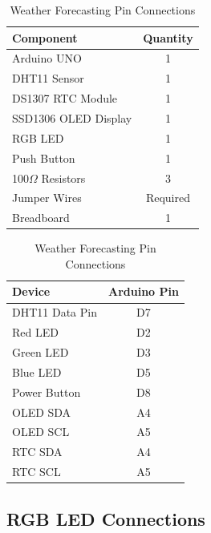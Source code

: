 \begin{table}[H]
\centering

\begin{minipage}[t]{0.52\textwidth}
\centering
\caption{Weather Forecasting System Components}
\label{tab:weather_components}

\begin{tabular}{|p{4.2cm}|c|}
\hline
\textbf{Component} & \textbf{Quantity} \\
\hline
Arduino UNO & 1 \\
DHT11 Sensor & 1 \\
DS1307 RTC Module & 1 \\
SSD1306 OLED Display & 1 \\
RGB LED & 1 \\
Push Button & 1 \\
100$\Omega$ Resistors & 3 \\
Jumper Wires & Required \\
Breadboard & 1 \\
\hline
\end{tabular}

\end{minipage}
\hfill
\begin{minipage}[t]{0.43\textwidth}
\centering
\caption{Weather Forecasting Pin Connections}
\label{tab:weather_pins}

\begin{tabular}{|l|c|}
\hline
\textbf{Device} & \textbf{Arduino Pin} \\
\hline
DHT11 Data Pin & D7 \\
Red LED & D2 \\
Green LED & D3 \\
Blue LED & D5 \\
Power Button & D8 \\
OLED SDA & A4 \\
OLED SCL & A5 \\
RTC SDA & A4 \\
RTC SCL & A5 \\
\hline
\end{tabular}

\end{minipage}

\end{table}


\subsection{RGB LED Connections}

